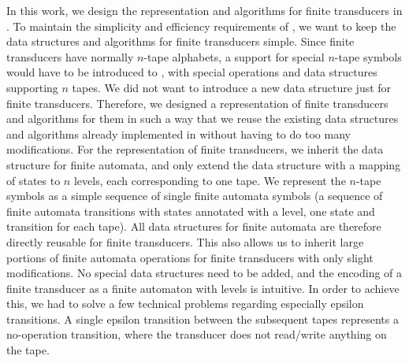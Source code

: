 In this work, we design the representation and algorithms for finite transducers in \mata.
To maintain the simplicity and efficiency requirements of \mata, we want to keep the data structures and algorithms for finite transducers simple.
Since finite transducers have normally $n$-tape alphabets, a support for special $n$-tape symbols would have to be introduced to \mata, with special operations and data structures supporting $n$ tapes.
We did not want to introduce a new data structure just for finite transducers.
Therefore, we designed a representation of finite transducers and algorithms for them in such a way that we reuse the existing data structures and algorithms already implemented in \mata without having to do too many modifications.
For the representation of finite transducers, we inherit the data structure for finite automata, and only extend the data structure with a mapping of states to $n$ levels, each corresponding to one tape.
We represent the $n$-tape symbols as a simple sequence of single finite automata symbols (a sequence of finite automata transitions with states annotated with a level, one state and transition for each tape).
All data structures for finite automata are therefore directly reusable for finite transducers.
This also allows us to inherit large portions of finite automata operations for finite transducers with only slight modifications.
No special data structures need to be added, and the encoding of a finite transducer as a finite automaton with levels is intuitive.
In order to achieve this, we had to solve a few technical problems regarding especially epsilon transitions.
A single epsilon transition between the subsequent tapes represents a no-operation transition, where the transducer does not read/write anything on the tape.

